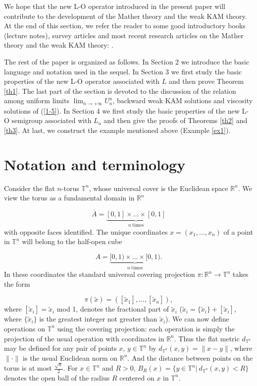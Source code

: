 \documentclass{amsart}[12pt]
\theoremstyle{definition}
\theoremstyle{remark}
\numberwithin{equation}{section}
\begin{document}
We hope that the new L-O operator introduced in the present paper
will contribute to the development of the Mather theory and the
weak KAM theory. At the end of this section, we refer the reader
to some good introductory books (lecture notes), survey articles
and most recent research articles on the Mather theory and the
weak KAM theory:
\cite{Mat-b,Fat-b,Con-b,Sor-b,Man92,Man96,Eva04,Eva08,Kal,Arn11,Arn,Ber08,Ber082,Eva09,Gom08,Gom10}.

The rest of the paper is organized as follows. In Section 2 we
introduce the basic language and notation used in the sequel. In
Section 3 we first study the basic properties of the new L-O
operator associated with $L$ and then prove Theorem \ref{th1}. The
last part of the section is devoted to the discussion of the
relation among uniform limits $\lim_{n\to+\infty}U^u_n$, backward
weak KAM solutions and viscosity solutions of (\ref{1-5}). In
Section 4 we first study the basic properties of the new L-O
semigroup associated with $L_a$ and then give the proofs of
Theorems \ref{th2} and \ref{th3}. At last, we construct the
example mentioned above (Example \ref{ex1}).

\section{Notation and terminology}
Consider the flat $n$-torus $\mathbb{T}^n$, whose universal cover
is the Euclidean space $\mathbb{R}^n$. We view the torus as a
fundamental domain in $\mathbb{R}^n$

\[
\overline{A}=\underbrace{[0,1]\times\dots\times[0,1]}_{n\
\mathrm{times}}
\]
with opposite faces identified. The unique coordinates
$x=(x_1,\dots,x_n)$ of a point in $\mathbb{T}^n$ will belong to
the half-open cube

\[
A=\underbrace{[0,1)\times\dots\times[0,1)}_{n\ \mathrm{times}}.
\]
In these coordinates the standard universal covering projection
$\pi:\mathbb{R}^n\rightarrow\mathbb{T}^n$ takes the form

\[
\pi(\tilde{x})=([\tilde{x}_1],\dots,[\tilde{x}_n]),
\]
where $[\tilde{x}_i]=\tilde{x}_i$ mod 1, denotes the fractional
part of $\tilde{x}_i$
($\tilde{x}_i=\{\tilde{x}_i\}+[\tilde{x}_i]$, where
$\{\tilde{x}_i\}$ is the greatest integer not greater than
$\tilde{x}_i$). We can now define operations on $\mathbb{T}^n$
using the covering projection: each operation is simply the
projection of the usual operation with coordinates in
$\mathbb{R}^n$. Thus the flat metric $d_{\mathbb{T}^n}$ may be
defined for any pair of points $x$, $y\in\mathbb{T}^n$ by
$d_{\mathbb{T}^n}(x,y)=\|x-y\|$, where $\|\cdot\|$ is the usual
Euclidean norm on $\mathbb{R}^n$. And the distance between points
on the torus is at most $\frac{\sqrt{n}}{2}$. For
$x\in\mathbb{T}^n$ and $R>0$, $B_R(x)=\{y\in\mathbb{T}^n|\
d_{\mathbb{T}^n}(x,y)<R\}$ denotes the open ball of the radius $R$
centered on $x$ in $\mathbb{T}^n$.
\end{document}
